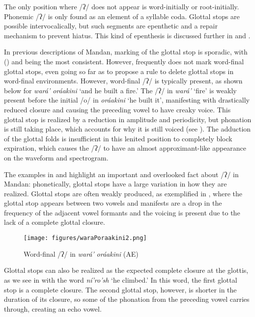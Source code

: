 The only position where /ʔ/ does not appear is word-initially or root-initially. Phonemic /ʔ/ is only found as an element of a syllable coda. Glottal stops are possible intervocalically, but such segments are epenthetic and a repair mechanism to prevent hiatus. This kind of epenthesis is discussed further in  and .

In previous descriptions of Mandan, marking of the glottal stop is sporadic, with \citeauthor{hollow1970} (\citeyear{hollow1970,hollow1973a,hollow1973b}) and \citet{hollow1976} being the most consistent. However, \citeauthor{hollow1970} frequently does not mark word-final glottal stops, even going so far as to propose a rule to delete glottal stops in word-final environments. However, word-final /ʔ/ is typically present, as shown below for \textit{wará' oráakini} `and he built a fire.' The /ʔ/ in \textit{wará'} `fire' is weakly present before the initial /o/ in \textit{oráakini} `he built it', manifesting with drastically reduced closure and causing the preceding vowel to have creaky voice. This glottal stop is realized by a reduction in amplitude and periodicity, but phonation is still taking place, which accounts for why it is still voiced (see ). The adduction of the glottal folds is insufficient in this lenited position to completely block expiration, which causes the /ʔ/ to have an almost approximant-like appearance on the waveform and spectrogram. %

The examples   in  and  highlight an important and overlooked fact about /ʔ/ in Mandan: phonetically, glottal stops have a large variation in how they are realized. Glottal stops are often weakly produced, as exemplified in , where the glottal stop appears between two vowels and manifests are a drop in the frequency of the adjacent vowel formants and the voicing is present due to the lack of a complete glottal closure.

\begin{figure}

\caption{Word-final /ʔ/ in \textit{wará' oráakini} (AE)}\label{AEglottals1}
\texttt{[image: figures/waraPoraakini2.png]}
\end{figure}

Glottal stops can also be realized as the expected complete closure at the glottis, as we see in    with the word \textit{ní'ro'sh} `he climbed.'  In this word, the first glottal stop is a complete closure. The second glottal stop, however, is shorter in the duration of its closure, so some of the phonation from the preceding vowel carries through, creating an echo vowel.


